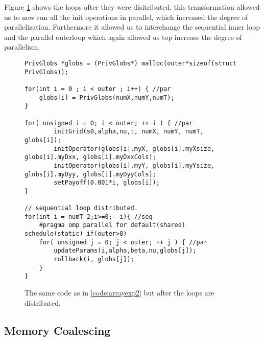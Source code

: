 Figure \ref{code:arrayexp3} shows the loops after they were disitributed, this
transformation allowed us to now run all the init operations in parallel, which
increased the degree of parallelization. Furthermore it allowed us to
interchange the sequential inner loop and the parallel outerloop which again
allowed us top increase the degree of parallelism.

\begin{figure}[H]
    \begin{lstlisting}
PrivGlobs *globs = (PrivGlobs*) malloc(outer*sizeof(struct PrivGlobs));

for(int i = 0 ; i < outer ; i++) { //par
    globs[i] = PrivGlobs(numX,numY,numT);
}

for( unsigned i = 0; i < outer; ++ i ) { //par
        initGrid(s0,alpha,nu,t, numX, numY, numT, globs[i]);
        initOperator(globs[i].myX, globs[i].myXsize, globs[i].myDxx, globs[i].myDxxCols);
        initOperator(globs[i].myY, globs[i].myYsize, globs[i].myDyy, globs[i].myDyyCols);
        setPayoff(0.001*i, globs[i]);
}

// sequential loop distributed.
for(int i = numT-2;i>=0;--i){ //seq
    #pragma omp parallel for default(shared) schedule(static) if(outer>8)
    for( unsigned j = 0; j < outer; ++ j ) { //par
        updateParams(i,alpha,beta,nu,globs[j]);
        rollback(i, globs[j]);
    }
}
    \end{lstlisting}
    \caption{The same code as in \ref{code:arrayexp2} but after the loops are
    distributed.}
    \label{code:arrayexp3}
\end{figure}

\subsection{Memory Coalescing}